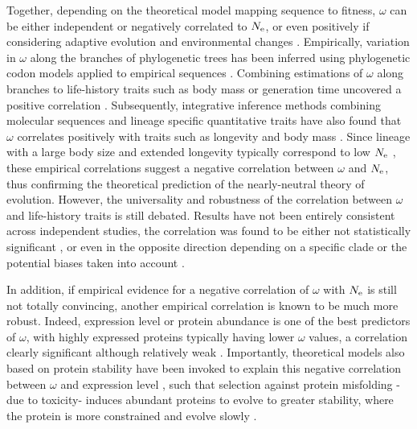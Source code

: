 Together, depending on the theoretical model mapping sequence to fitness, $\omega$ can be either independent or negatively correlated to $N_{\mathrm{e}}$, or even positively if considering adaptive evolution and environmental changes \citep{Lanfear2014}.
Empirically, variation in $\omega$ along the branches of phylogenetic trees has been inferred using phylogenetic codon models applied to empirical sequences \citep{Yang2001, Zhang2004}. 
Combining estimations of $\omega$ along branches to life-history traits such as body mass or generation time uncovered a positive correlation \citep{Popadin2007, Nikolaev2007}.
Subsequently, integrative inference methods combining molecular sequences and lineage specific quantitative traits have also found that $\omega$ correlates positively with traits such as longevity and body mass \citep{Lartillot2011, Figuet2017}.
Since lineage with a large body size and extended longevity typically correspond to low $N_{\mathrm{e}}$ \citep{Romiguier2014}, these empirical correlations suggest a negative correlation between $\omega$ and $N_{\mathrm{e}}$, thus confirming the theoretical prediction of the nearly-neutral theory of evolution.
However, the universality and robustness of the correlation between $\omega$ and life-history traits is still debated. 
Results have not been entirely consistent across independent studies, the correlation was found to be either not statistically significant \citep{Lartillot2012}, or even in the opposite direction depending on a specific clade or the potential biases taken into account \citep{Lanfear2010, Nabholz2013, Lanfear2014, Figuet2016}.

In addition, if empirical evidence for a negative correlation of $\omega$ with $N_{\mathrm{e}}$ is still not totally convincing, another empirical correlation is known to be much more robust.
Indeed, expression level or protein abundance is one of the best predictors of $\omega$, with highly expressed proteins typically having lower $\omega$ values, a correlation clearly significant although relatively weak \citep{Duret2000, Rocha2004, Drummond2005a, Zhang2015, Song2017}.
Importantly, theoretical models also based on protein stability have been invoked to explain this negative correlation between $\omega$ and expression level \citep{Wilke2006, Drummond2008}, such that selection against protein misfolding -due to toxicity- induces abundant proteins to evolve to greater stability, where the protein is more constrained and evolve slowly \citep{Serohijos2012}.

